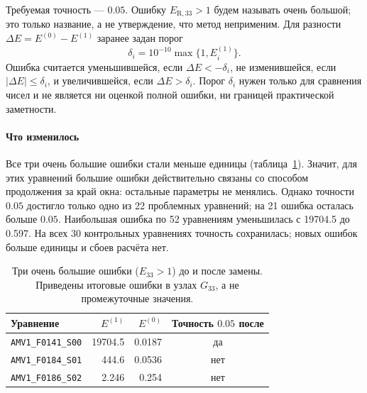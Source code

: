\documentclass[14pt,a4paper]{extarticle}
\begin{document}
Требуемая точность --- $0.05$. Ошибку $E_{\mathrm{R},33}>1$ будем
называть очень большой; это только название, а не утверждение, что
метод неприменим. Для разности $\Delta E=E^{(0)}-E^{(1)}$ заранее задан
порог
\[
\delta_i=10^{-10}\max\{1,E_i^{(1)}\}.
\]
Ошибка считается уменьшившейся, если $\Delta E<-\delta_i$,
не изменившейся, если $|\Delta E|\le\delta_i$, и увеличившейся, если
$\Delta E>\delta_i$. Порог $\delta_i$ нужен только для сравнения чисел
и не является ни оценкой полной ошибки, ни границей практической
заметности.

\begin{table}[!htbp]
\centering
\caption{Результат замены плавного затухания на продолжение нулём.
Уменьшение, неизменность и увеличение ошибки определены с порогом
$\delta_i$. В столбцах <<до/после>> указано число уравнений при исходном
продолжении и при продолжении нулём.}
\label{tab:boundarydev-groups}
\end{table}

\paragraph{Что изменилось\\}
Все три очень большие ошибки стали меньше единицы
(таблица~\ref{tab:boundarydev-extremes}). Значит, для этих уравнений
большие ошибки действительно связаны со способом продолжения за край
окна: остальные параметры не менялись. Однако точности $0.05$ достигло
только одно из 22 проблемных уравнений; на 21 ошибка осталась больше
$0.05$. Наибольшая ошибка по 52 уравнениям уменьшилась с 19704.5
до 0.597. На всех 30 контрольных уравнениях точность сохранилась;
новых ошибок больше единицы и сбоев расчёта нет.

\begin{table}[!htbp]
\centering
\caption{Три очень большие ошибки ($E_{33}>1$) до и после замены.
Приведены итоговые ошибки в узлах $G_{33}$, а не промежуточные значения.}
\label{tab:boundarydev-extremes}
\small
\begin{tabular}{lrrc}
\toprule
Уравнение & $E^{(1)}$ & $E^{(0)}$ & Точность $0.05$ после\\
\midrule
\texttt{AMV1\_F0141\_S00} & 19704.5 & 0.0187 & да\\
\texttt{AMV1\_F0184\_S01} & 444.6 & 0.0536 & нет\\
\texttt{AMV1\_F0186\_S02} & 2.246 & 0.254 & нет\\
\bottomrule
\end{tabular}
\end{table}
\end{document}
